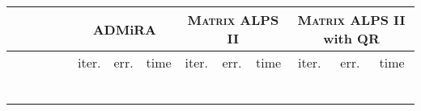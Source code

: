 \documentclass[twocolumn]{svjour3}
\begin{document}
\begin{table*}[!htp]
\begin{center}
\begin{tabular}{|c|c|c|c|c|c|c|c|c|c|c|c|c|c|}
\hline \hline \hline
\multicolumn{4}{c|}{} & & \multicolumn{3}{|c|}{ADMiRA} & \multicolumn{3}{|c|}{\textsc{Matrix ALPS II}} & \multicolumn{3}{|c}{\textsc{Matrix ALPS II} with QR} \\
\hline \hline
\multicolumn{1}{c}{} & \multicolumn{1}{c}{} & \multicolumn{1}{c}{} & \multicolumn{1}{c|}{} & & 
\multicolumn{1}{|c}{\rm{iter.}} & \multicolumn{1}{c}{\rm{err.}} & \multicolumn{1}{c|}{\rm{time}} &
\multicolumn{1}{|c}{\rm{iter.}} & \multicolumn{1}{c}{\rm{err.}} & \multicolumn{1}{c|}{\rm{time}} &
\multicolumn{1}{|c}{\rm{iter.}} & \multicolumn{1}{c}{\rm{err.}} & \multicolumn{1}{c}{\rm{time}} \\
\hline\hline
\multicolumn{1}{c}{} & \multicolumn{1}{c}{} & \multicolumn{1}{c}{} & \multicolumn{1}{c|}{} &  & 
\multicolumn{1}{|c}{} & \multicolumn{1}{c}{} & \multicolumn{1}{c|}{} &
\multicolumn{1}{|c}{} & \multicolumn{1}{c}{} & \multicolumn{1}{c|}{} &
\multicolumn{1}{|c}{} & \multicolumn{1}{c}{} & \multicolumn{1}{c}{} \\
\hline
\multicolumn{1}{c}{} & \multicolumn{1}{c}{} & \multicolumn{1}{c}{} & \multicolumn{1}{c|}{} &  & 
\multicolumn{1}{|c}{} & \multicolumn{1}{c}{} & \multicolumn{1}{c|}{} &
\multicolumn{1}{|c}{} & \multicolumn{1}{c}{} & \multicolumn{1}{c|}{} &
\multicolumn{1}{|c}{} & \multicolumn{1}{c}{} & \multicolumn{1}{c}{} \\
\hline
\multicolumn{1}{c}{} & \multicolumn{1}{c}{} & \multicolumn{1}{c}{} & \multicolumn{1}{c|}{} &  & 
\multicolumn{1}{|c}{} & \multicolumn{1}{c}{} & \multicolumn{1}{c|}{} &
\multicolumn{1}{|c}{} & \multicolumn{1}{c}{} & \multicolumn{1}{c|}{} &
\multicolumn{1}{|c}{} & \multicolumn{1}{c}{} & \multicolumn{1}{c}{} \\
\hline
\multicolumn{1}{c}{} & \multicolumn{1}{c}{} & \multicolumn{1}{c}{} & \multicolumn{1}{c|}{} &  & 
\multicolumn{1}{|c}{} & \multicolumn{1}{c}{} & \multicolumn{1}{c|}{} &
\multicolumn{1}{|c}{} & \multicolumn{1}{c}{} & \multicolumn{1}{c|}{} &
\multicolumn{1}{|c}{} & \multicolumn{1}{c}{} & \multicolumn{1}{c}{} \\
\hline
\multicolumn{1}{c}{} & \multicolumn{1}{c}{} & \multicolumn{1}{c}{} & \multicolumn{1}{c|}{} &  & 
\multicolumn{1}{|c}{} & \multicolumn{1}{c}{} & \multicolumn{1}{c|}{} &
\multicolumn{1}{|c}{} & \multicolumn{1}{c}{} & \multicolumn{1}{c|}{} &
\multicolumn{1}{|c}{} & \multicolumn{1}{c}{} & \multicolumn{1}{c}{} \\
\hline
\multicolumn{1}{c}{} & \multicolumn{1}{c}{} & \multicolumn{1}{c}{} & \multicolumn{1}{c|}{} &  & 
\multicolumn{1}{|c}{} & \multicolumn{1}{c}{} & \multicolumn{1}{c|}{} &

\end{tabular}
\end{center}
\end{table*}
\end{document}
